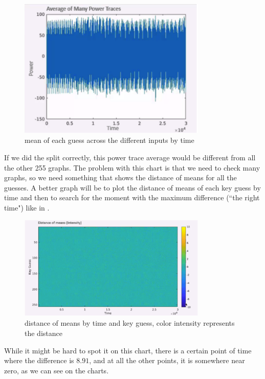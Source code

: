 \begin{figure}[!ht]
    \centering
    \includegraphics[width=0.8\textwidth]{images/Lecture6/avg_of_many_traces.png}
    \caption{mean of each guess across the different inputs by time} \label{fig:avg_of_many_traces}
\end{figure}


If we did the split correctly, this power trace average would be different from all the other 255 graphs. 
The problem with this chart is that we need to check many graphs, so we need something that shows the distance of means for all the guesses. 
A better graph will be to plot the distance of means of each key guess by time and then to search for the moment with the maximum difference (``the right time") like in .

\begin{figure}[!ht]
    \centering
    \includegraphics[width=0.8\textwidth]{images/Lecture6/intensity_represents_means_diff.png}
    \caption{distance of means by time and key guess, color intensity represents the distance} \label{fig:intensity_represents_means_diff}
\end{figure}

While it might be hard to spot it on this chart, there is a certain point of time where the difference is $8.91$, and at all the other points, it is somewhere near zero, as we can see on the charts.

